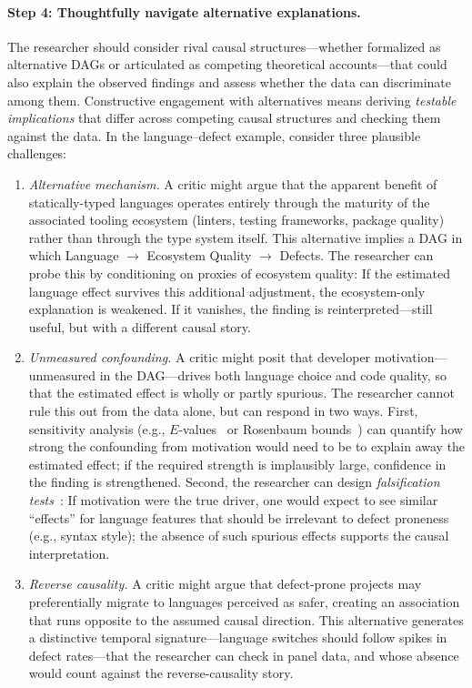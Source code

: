 \paragraph{Step 4: Thoughtfully navigate alternative explanations.}
The researcher should consider rival causal structures---whether formalized as alternative DAGs or articulated as competing theoretical accounts---that could also explain the observed findings and assess whether the data can discriminate among them.
Constructive engagement with alternatives means deriving \emph{testable implications} that differ across competing causal structures and checking them against the data.
In the language--defect example, consider three plausible challenges:
%
\begin{enumerate}[leftmargin=15pt]
\item \emph{Alternative mechanism.} A critic might argue that the apparent benefit of statically-typed languages operates entirely through the maturity of the associated tooling ecosystem (linters, testing frameworks, package quality) rather than through the type system itself. This alternative implies a DAG in which Language $\to$ Ecosystem Quality $\to$ Defects. The researcher can probe this by conditioning on proxies of ecosystem quality: If the estimated language effect survives this additional adjustment, the ecosystem-only explanation is weakened. If it vanishes, the finding is reinterpreted---still useful, but with a different causal story.

\item \emph{Unmeasured confounding.} A critic might posit that developer motivation---unmeasured in the DAG---drives both language choice and code quality, so that the estimated effect is wholly or partly spurious. The researcher cannot rule this out from the data alone, but can respond in two ways. First, sensitivity analysis (e.g., $E$-values~\cite{vanderweele2017sensitivity} or Rosenbaum bounds~\cite{rosenbaum2002observational}) can quantify how strong the confounding from motivation would need to be to explain away the estimated effect; if the required strength is implausibly large, confidence in the finding is strengthened. Second, the researcher can design \emph{falsification tests}~\cite{oster2019unobservable}: If motivation were the true driver, one would expect to see similar ``effects'' for language features that should be irrelevant to defect proneness (e.g., syntax style); the absence of such spurious effects supports the causal interpretation.

\item \emph{Reverse causality.} A critic might argue that defect-prone projects may preferentially migrate to languages perceived as safer, creating an association that runs opposite to the assumed causal direction. This alternative generates a distinctive temporal signature---language switches should follow spikes in defect rates---that the researcher can check in panel data, and whose absence would count against the reverse-causality story.
\end{enumerate}
